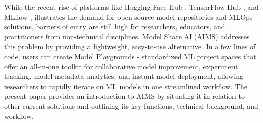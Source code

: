 While the recent rise of platforms like Hugging Face Hub \citep{noauthor_hugging_2023}, TensorFlow Hub \citep{noauthor_tensorflow_2023}, and MLflow \citep{noauthor_mlflow_2023,chen_developments_2020, zaharia_accelerating_2018}, illustrates the demand for open-source model repositories and MLOps solutions, barriers of entry are still high for researchers, educators, and practitioners from non-technical disciplines. Model Share AI (AIMS) addresses this problem by providing a lightweight, easy-to-use alternative. In a few lines of code, users can create Model Playgrounds - standardized ML project spaces that offer an all-in-one toolkit for collaborative model improvement, experiment tracking, model metadata analytics, and instant model deployment, allowing researchers to rapidly iterate on ML models in one streamlined workflow. The present paper provides an introduction to AIMS by situating it in relation to other current solutions and outlining its key functions, technical background, and workflow. 


